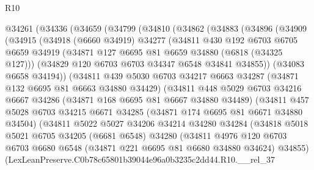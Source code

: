 \begin{lexlean}{R10}
\begin{coremodule}
  @34261
    (@34336
      (@34659
        (@34799
          (@34810
            (@34862
              (@34883
                (@34896
                  (@34909
                    (@34915
                      (@34918
                        (@6660 @34919)
                        @34277
                        (@34811
                          @430
                          @192
                          @6703
                          @6705
                          @6659
                          @34919
                          (@34871 @127 @6695 @81 @6659 @34880 (@6818 (@34325 @127)))
                          (@34829 @120 @6703 @6703 @34347 @6548 @34841 @34855))
                        (@34083 @6658 @34194))
                      (@34811
                        @439
                        @5030
                        @6703
                        @34217
                        @6663
                        @34287
                        (@34871 @132 @6695 @81 @6663 @34880 @34429)
                        (@34811
                          @448
                          @5029
                          @6703
                          @34216
                          @6667
                          @34286
                          (@34871 @168 @6695 @81 @6667 @34880 @34489)
                          (@34811
                            @457
                            @5028
                            @6703
                            @34215
                            @6671
                            @34285
                            (@34871 @174 @6695 @81 @6671 @34880 @34504)
                            (@34811
                              @5022
                              @5027
                              @34206
                              @34214
                              @34280
                              @34284
                              (@34818
                                @5018
                                @5021
                                @6705
                                @34205
                                (@6681 @6548)
                                @34280
                                (@34811
                                  @4976
                                  @120
                                  @6703
                                  @6703
                                  @6680
                                  @6548
                                  (@34871 @221 @6695 @81 @6680 @34880 @34624)
                                  @34855)
                                (LexLeanPreserve.C0b78c65801b39044e96a0b3235c2dd44.R10.__rel_37

\end{coremodule}
\end{lexlean}
